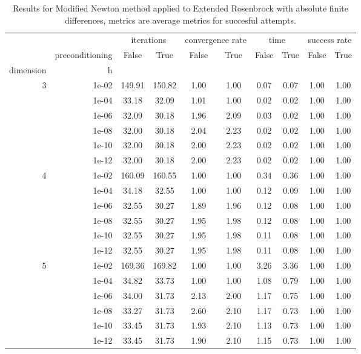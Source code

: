\begin{table}
\centering
\caption{Results for Modified Newton method applied to Extended Rosenbrock with absolute finite differences, metrics are average metrics for succesful attempts.}
\label{tab:Modified_Newton_Extended_Rosenbrock_fd_abs}
\begin{tabular}{rr|cc|cc|cc|cc}
\toprule
    &  & \multicolumn{2}{|c}{iterations} & \multicolumn{2}{|c}{convergence rate} & \multicolumn{2}{|c}{time} & \multicolumn{2}{|c}{success rate} \\
    & preconditioning & False & True & False & True & False & True & False & True \\
dimension & h &  &  &  &  &  &  &  &  \\
\midrule
\multirow[t]{6}{*}{3} & 1e-02 & 149.91 & 150.82 & 1.00 & 1.00 & 0.07 & 0.07 & 1.00 & 1.00 \\
    & 1e-04 & 33.18 & 32.09 & 1.01 & 1.00 & 0.02 & 0.02 & 1.00 & 1.00 \\
    & 1e-06 & 32.09 & 30.18 & 1.96 & 2.09 & 0.03 & 0.02 & 1.00 & 1.00 \\
    & 1e-08 & 32.00 & 30.18 & 2.04 & 2.23 & 0.02 & 0.02 & 1.00 & 1.00 \\
    & 1e-10 & 32.00 & 30.18 & 2.00 & 2.23 & 0.02 & 0.02 & 1.00 & 1.00 \\
    & 1e-12 & 32.00 & 30.18 & 2.00 & 2.23 & 0.02 & 0.02 & 1.00 & 1.00 \\
\cline{1-10}
\multirow[t]{6}{*}{4} & 1e-02 & 160.09 & 160.55 & 1.00 & 1.00 & 0.34 & 0.36 & 1.00 & 1.00 \\
    & 1e-04 & 34.18 & 32.55 & 1.00 & 1.00 & 0.12 & 0.09 & 1.00 & 1.00 \\
    & 1e-06 & 32.55 & 30.27 & 1.89 & 1.96 & 0.12 & 0.08 & 1.00 & 1.00 \\
    & 1e-08 & 32.55 & 30.27 & 1.95 & 1.98 & 0.12 & 0.08 & 1.00 & 1.00 \\
    & 1e-10 & 32.55 & 30.27 & 1.95 & 1.98 & 0.11 & 0.08 & 1.00 & 1.00 \\
    & 1e-12 & 32.55 & 30.27 & 1.95 & 1.98 & 0.11 & 0.08 & 1.00 & 1.00 \\
\cline{1-10}
\multirow[t]{6}{*}{5} & 1e-02 & 169.36 & 169.82 & 1.00 & 1.00 & 3.26 & 3.36 & 1.00 & 1.00 \\
    & 1e-04 & 34.82 & 33.73 & 1.00 & 1.00 & 1.08 & 0.79 & 1.00 & 1.00 \\
    & 1e-06 & 34.00 & 31.73 & 2.13 & 2.00 & 1.17 & 0.75 & 1.00 & 1.00 \\
    & 1e-08 & 33.27 & 31.73 & 2.60 & 2.10 & 1.17 & 0.73 & 1.00 & 1.00 \\
    & 1e-10 & 33.45 & 31.73 & 1.93 & 2.10 & 1.13 & 0.73 & 1.00 & 1.00 \\
    & 1e-12 & 33.45 & 31.73 & 1.90 & 2.10 & 1.15 & 0.73 & 1.00 & 1.00 \\
\cline{1-10}
\bottomrule
\end{tabular}
\end{table}

